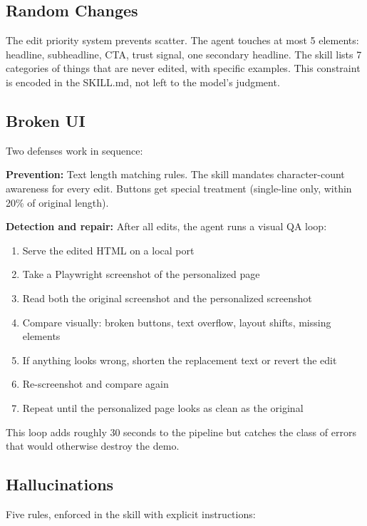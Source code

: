 \documentclass{article}
\begin{document}
\subsection{Random Changes}

The edit priority system prevents scatter. The agent touches at most 5 elements: headline, subheadline, CTA, trust signal, one secondary headline. The skill lists 7 categories of things that are never edited, with specific examples. This constraint is encoded in the SKILL.md, not left to the model's judgment.

\subsection{Broken UI}

Two defenses work in sequence:

\textbf{Prevention:} Text length matching rules. The skill mandates character-count awareness for every edit. Buttons get special treatment (single-line only, within 20\% of original length).

\textbf{Detection and repair:} After all edits, the agent runs a visual QA loop:
\begin{enumerate}[leftmargin=2em]
    \item Serve the edited HTML on a local port
    \item Take a Playwright screenshot of the personalized page
    \item Read both the original screenshot and the personalized screenshot
    \item Compare visually: broken buttons, text overflow, layout shifts, missing elements
    \item If anything looks wrong, shorten the replacement text or revert the edit
    \item Re-screenshot and compare again
    \item Repeat until the personalized page looks as clean as the original
\end{enumerate}

This loop adds roughly 30 seconds to the pipeline but catches the class of errors that would otherwise destroy the demo.

\subsection{Hallucinations}

Five rules, enforced in the skill with explicit instructions:
\end{document}
